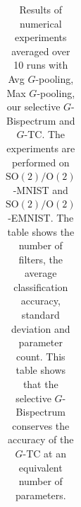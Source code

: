 \documentclass{article}
\theoremstyle{plain}
\theoremstyle{definition}
\theoremstyle{remark}
\begin{document}
\begin{table}
\begin{tabular}{||c|c|c|c|c|c|c|c||}
\end{tabular}
\caption{Results of numerical experiments averaged over 10 runs with Avg $G$-pooling, Max $G$-pooling, our selective $G$-Bispectrum and $G$-TC. The experiments are performed on $\mathrm{SO}(2)/\mathrm{O}(2)$-MNIST and $\mathrm{SO}(2)/\mathrm{O}(2)$-EMNIST. %
The table shows the number of filters, the average classification accuracy, standard deviation and parameter count. This table shows that the selective $G$-Bispectrum conserves the accuracy of the $G$-TC at an equivalent number of parameters. \vspace{-0.1cm}}
\label{tab:classification}
\end{table}
\end{document}

